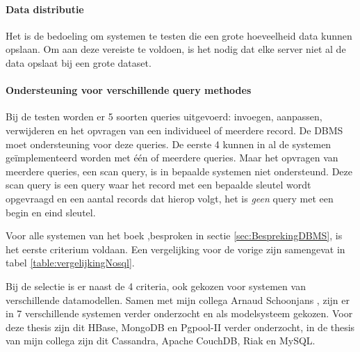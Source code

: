 \paragraph{Data distributie} Het is de bedoeling om systemen te testen die een grote hoeveelheid data kunnen opslaan. Om aan deze vereiste te voldoen, is het nodig dat elke server niet al de data opslaat bij een grote dataset. 

\paragraph{Ondersteuning voor verschillende query methodes} Bij de testen worden er 5 soorten queries uitgevoerd: invoegen, aanpassen, verwijderen en het opvragen van een individueel of meerdere record. De DBMS moet ondersteuning voor deze queries. De eerste 4 kunnen in al de systemen geïmplementeerd worden met één of meerdere queries. Maar het opvragen van meerdere queries, een scan query, is in bepaalde systemen niet ondersteund. Deze scan query is een query waar het record met een bepaalde sleutel wordt opgevraagd en een aantal records dat hierop volgt, het is \textit{geen} query met een begin en eind sleutel. 

Voor alle systemen van het boek \cite{Strauch.NoSQL},besproken in sectie \ref{sec:BesprekingDBMS}, is het eerste criterium voldaan. Een vergelijking voor de vorige  zijn samengevat in tabel \ref{table:vergelijkingNosql}.

Bij de selectie is er naast de 4 criteria, ook gekozen voor systemen van verschillende datamodellen. Samen met mijn collega Arnaud Schoonjans \cite{thesisArnaud}, zijn er in 7 verschillende systemen verder onderzocht en als modelsysteem gekozen. Voor deze thesis zijn dit HBase, MongoDB en Pgpool-II verder onderzocht, in de thesis van mijn collega zijn dit Cassandra, Apache CouchDB, Riak en MySQL. 
 

